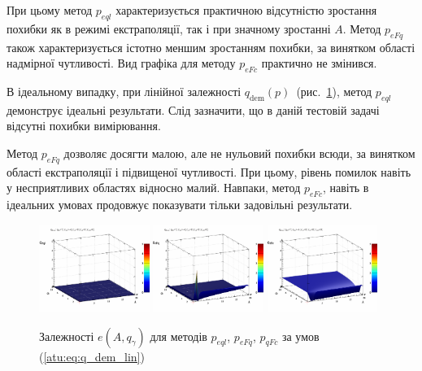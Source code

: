 При цьому метод
$p_{eql}$ характеризується практичною відсутністю зростання
похибки як в режимі екстраполяції, так і при значному зростанні
$A$. Метод
$p_{eFq}$ також характеризується істотно меншим зростанням
похибки, за винятком області надмірної чутливості. Вид графіка
для методу
$p_{eFc}$ практично не змінився.

В ідеальному випадку, при лінійної залежності
$q_\mathrm{dem}(p)$~(рис.~\ref{atu:f:qsl_pe_A_qg_lin}), метод
$p_{eql}$ демонструє ідеальні результати. Слід зазначити, що в
даній тестовій задачі відсутні похибки вимірювання.

Метод
$p_{eFq}$ дозволяє досягти малою, але не нульовий
похибки всюди, за винятком області екстраполяції і підвищеної
чутливості. При цьому, рівень помилок навіть у несприятливих
областях відносно малий. Навпаки, метод
$p_{eFc}$, навіть в ідеальних умовах продовжує показувати тільки задовільні
результати.

\begin{figure}[htb!]
  \begin{center}
    \includegraphics[width=0.32\textwidth]{p/qls_pe-p_A_qg_eql_lin.png}
    \hfill
    \includegraphics[width=0.32\textwidth]{p/qls_pe-p_A_qg_eFq_lin.png}
    \hfill
    \includegraphics[width=0.32\textwidth]{p/qls_pe-p_A_qg_eFc_lin.png}
  \end{center}
  \caption{Залежності $e(A,q_\gamma)$ для методів $p_{eql}$, $p_{eFq}$, $p_{qFc}$ за умов (\ref{atu:eq:q_dem_lin})}
  \label{atu:f:qsl_pe_A_qg_lin}
\end{figure}

